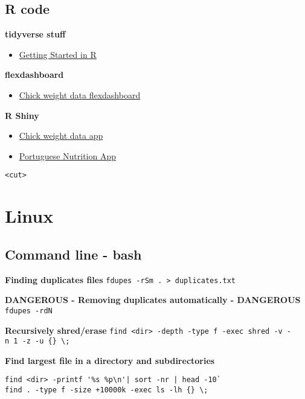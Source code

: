 \documentclass[]{book}
\providecommand{\tightlist}{%
  \setlength{\itemsep}{0pt}\setlength{\parskip}{0pt}}
\theoremstyle{definition}
\theoremstyle{definition}
\theoremstyle{definition}
\theoremstyle{remark}
\begin{document}
\section{R code}\label{r-code}

\textbf{tidyverse stuff}

\begin{itemize}
\tightlist
\item
  \href{https://github.com/saghirb/Getting-Started-in-R}{Getting Started
  in R}
\end{itemize}

\textbf{flexdashboard}

\begin{itemize}
\tightlist
\item
  \href{https://github.com/saghirb/Chick_Weight_Flexdashboard}{Chick
  weight data flexdashboard}
\end{itemize}

\textbf{R Shiny}

\begin{itemize}
\tightlist
\item
  \href{https://github.com/saghirb/Chick_Weight_Basic_App}{Chick weight
  data app}
\item
  \href{https://github.com/saghirb/Nutri_PT}{Portuguese Nutrition App}
\end{itemize}

\texttt{\textless{}cut\textgreater{}}

\chapter{Linux}\label{linux}

\section{Command line - bash}\label{command-line---bash}

\textbf{Finding duplicates files}
\texttt{fdupes\ -rSm\ .\ \textgreater{}\ duplicates.txt}

\textbf{DANGEROUS - Removing duplicates automatically - DANGEROUS}
\texttt{fdupes\ -rdN}

\textbf{Recursively shred/erase}
\texttt{find\ \textless{}dir\textgreater{}\ -depth\ -type\ f\ -exec\ shred\ -v\ -n\ 1\ -z\ -u\ \{\}\ \textbackslash{};}

\textbf{Find largest file in a directory and subdirectories}

\begin{verbatim}
find <dir> -printf '%s %p\n'| sort -nr | head -10`
find . -type f -size +10000k -exec ls -lh {} \;
\end{verbatim}
\end{document}
